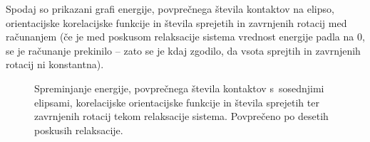 Spodaj so prikazani grafi energije, povprečnega števila kontaktov na elipso, orientacijske
korelacijske funkcije in števila sprejetih in zavrnjenih rotacij med računanjem 
(če je med poskusom relaksacije sistema vrednost energije padla na $0$, se je računanje 
prekinilo -- zato se je kdaj zgodilo, da vsota sprejtih in zavrnjenih rotacij ni konstantna).
\begin{figure}
    \centering
    \resizebox{.45\textwidth}{!}{}
    \resizebox{.45\textwidth}{!}{}
    \resizebox{.45\textwidth}{!}{}
    \resizebox{.45\textwidth}{!}{}
    \resizebox{.45\textwidth}{!}{}
    \resizebox{.45\textwidth}{!}{}
    \resizebox{.45\textwidth}{!}{}
    \resizebox{.45\textwidth}{!}{}
    \caption{Spreminjanje energije, povprečnega števila kontaktov s~sosednjimi elipsami,
    korelacijske orientacijske funkcije in števila sprejetih ter zavrnjenih rotacij tekom
    relaksacije sistema. Povprečeno po desetih poskusih relaksacije.}
    \label{fig:average_a_01}
\end{figure}
